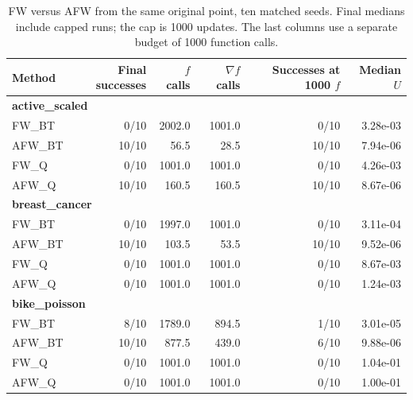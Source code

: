 \begin{table}[htbp]
\centering\small
\caption{FW versus AFW from the same original point, ten matched seeds. Final medians include capped runs; the cap is 1000 updates. The last columns use a separate budget of 1000 function calls.}
\label{tab:away}
\begin{tabular}{lrrrrr}
\hline
Method & Final successes & $f$ calls & $\nabla f$ calls & Successes at 1000 $f$ & Median $U$ \\
\hline
\multicolumn{6}{l}{\textbf{active\_scaled}} \\
FW\_BT & 0/10 & 2002.0 & 1001.0 & 0/10 & 3.28e-03 \\
AFW\_BT & 10/10 & 56.5 & 28.5 & 10/10 & 7.94e-06 \\
FW\_Q & 0/10 & 1001.0 & 1001.0 & 0/10 & 4.26e-03 \\
AFW\_Q & 10/10 & 160.5 & 160.5 & 10/10 & 8.67e-06 \\
\hline
\multicolumn{6}{l}{\textbf{breast\_cancer}} \\
FW\_BT & 0/10 & 1997.0 & 1001.0 & 0/10 & 3.11e-04 \\
AFW\_BT & 10/10 & 103.5 & 53.5 & 10/10 & 9.52e-06 \\
FW\_Q & 0/10 & 1001.0 & 1001.0 & 0/10 & 8.67e-03 \\
AFW\_Q & 0/10 & 1001.0 & 1001.0 & 0/10 & 1.24e-03 \\
\hline
\multicolumn{6}{l}{\textbf{bike\_poisson}} \\
FW\_BT & 8/10 & 1789.0 & 894.5 & 1/10 & 3.01e-05 \\
AFW\_BT & 10/10 & 877.5 & 439.0 & 6/10 & 9.88e-06 \\
FW\_Q & 0/10 & 1001.0 & 1001.0 & 0/10 & 1.04e-01 \\
AFW\_Q & 0/10 & 1001.0 & 1001.0 & 0/10 & 1.00e-01 \\
\hline
\end{tabular}
\end{table}
